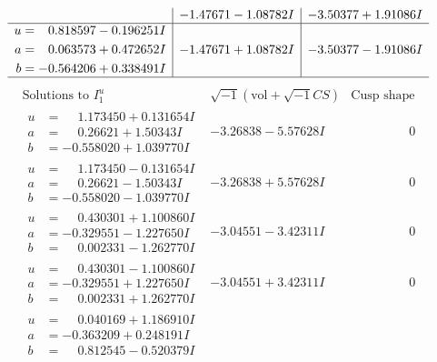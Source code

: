 \documentclass[1p]{elsarticle_modified}
\theoremstyle{definition}
\newcommand{\I}{\sqrt{-1}}
\begin{document}
$$\begin{array}{c|c|c}
 & -1.47671 - 1.08782 I & -3.50377 + 1.91086 I \\ \hline\begin{aligned}
u &= \phantom{-}0.818597 - 0.196251 I \\
a &= \phantom{-}0.063573 + 0.472652 I \\
b &= -0.564206 + 0.338491 I\end{aligned}
 & -1.47671 + 1.08782 I & -3.50377 - 1.91086 I\\
 \hline 
 \end{array}$$\newpage$$\begin{array}{c|c|c}  
\text{Solutions to }I^u_{1}& \I (\text{vol} + \sqrt{-1}CS) & \text{Cusp shape}\\
 \hline 
\begin{aligned}
u &= \phantom{-}1.173450 + 0.131654 I \\
a &= \phantom{-}0.26621 + 1.50343 I \\
b &= -0.558020 + 1.039770 I\end{aligned}
 & -3.26838 - 5.57628 I & \phantom{-0.000000 } 0 \\ \hline\begin{aligned}
u &= \phantom{-}1.173450 - 0.131654 I \\
a &= \phantom{-}0.26621 - 1.50343 I \\
b &= -0.558020 - 1.039770 I\end{aligned}
 & -3.26838 + 5.57628 I & \phantom{-0.000000 } 0 \\ \hline\begin{aligned}
u &= \phantom{-}0.430301 + 1.100860 I \\
a &= -0.329551 - 1.227650 I \\
b &= \phantom{-}0.002331 - 1.262770 I\end{aligned}
 & -3.04551 - 3.42311 I & \phantom{-0.000000 } 0 \\ \hline\begin{aligned}
u &= \phantom{-}0.430301 - 1.100860 I \\
a &= -0.329551 + 1.227650 I \\
b &= \phantom{-}0.002331 + 1.262770 I\end{aligned}
 & -3.04551 + 3.42311 I & \phantom{-0.000000 } 0 \\ \hline\begin{aligned}
u &= \phantom{-}0.040169 + 1.186910 I \\
a &= -0.363209 + 0.248191 I \\
b &= \phantom{-}0.812545 - 0.520379 I\end{aligned}

\end{array}$$
\end{document}
